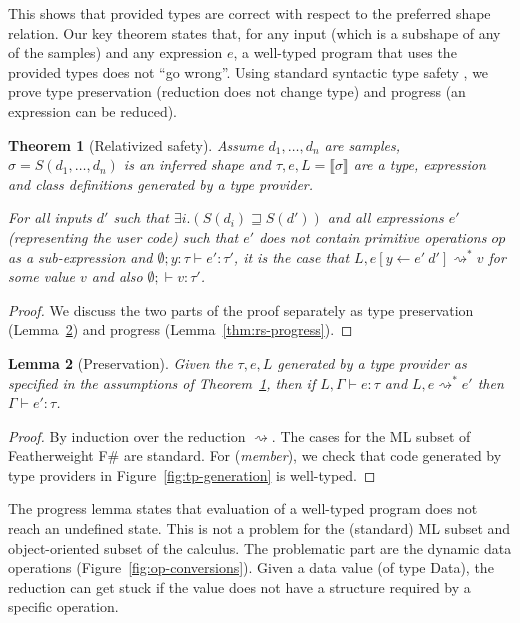 \documentclass[10pt,preprint,blind,clearpagebib]{sigplanconf}
\newcommand{\ident}[1]{\textnormal{\sffamily #1}}
\newcommand{\reduce}{\rightsquigarrow}
\newcommand{\sem}[1]{\llbracket #1 \rrbracket}
\newcommand{\semalt}[1]{S(#1)}
\newtheorem{theorem}{Theorem}
\newtheorem{lemma}[theorem]{Lemma}
\begin{document}
\noindent
This shows that provided types are correct with respect to the preferred shape relation. 
Our key theorem states that, for any input (which is a subshape of any of the samples) and 
any expression $e$, a well-typed program that uses the provided types does not ``go wrong''.
Using standard syntactic type safety  \cite{syntactic}, we prove type preservation 
(reduction does not change type) and progress (an expression can be reduced).

\begin{theorem}[Relativized safety]
\label{thm:safety}
Assume $d_1, \ldots, d_n$ are samples, $\sigma=\semalt{d_1, \ldots, d_n}$ is an inferred
shape and $\tau,e,L = \sem{\sigma}$ are a type, expression and class definitions generated by a 
type provider.

For all inputs $d'$ such that $\exists i.(\semalt{d_i} \sqsupseteq \semalt{d'})$ and all expressions $e'$
(representing the user code) such that $e'$ does not contain primitive operations $op$ as a sub-expression and
$\emptyset; y\!:\!\tau \vdash e'\!:\!\tau'$, it is the case that $L, e[y\leftarrow e'~d'] \reduce^{*} v$ for some value $v$ and
also $\emptyset; \vdash v : \tau'$.
\end{theorem}
\begin{proof}
We discuss the two parts of the proof separately as type preservation (Lemma~\ref{thm:rs-preservation})
and progress (Lemma~\ref{thm:rs-progress}).
\end{proof}

\begin{lemma}[Preservation]
\label{thm:rs-preservation}
Given the $\tau, e, L$ generated by a type provider as specified in
the assumptions of Theorem~\ref{thm:safety}, then if $L, \Gamma \vdash e : \tau$ and 
$L, e \reduce^{*} e'$ then $\Gamma \vdash e' : \tau$.
\end{lemma}
\begin{proof}
By induction over the reduction $\reduce$. The cases for the ML subset of Featherweight F\# 
are standard. For (\emph{member}), we check that code generated by type providers
in Figure~\ref{fig:tp-generation} is well-typed.
\end{proof}

\noindent
The progress lemma states that evaluation of a well-typed program does not reach an undefined state. 
This is not a problem for the (standard) ML subset and object-oriented subset of the calculus. The 
problematic part are the dynamic data operations (Figure~\ref{fig:op-conversions}). Given a data
value (of type \ident{Data}), the reduction can get stuck if the value does not have a structure 
required by a specific operation.
\end{document}
